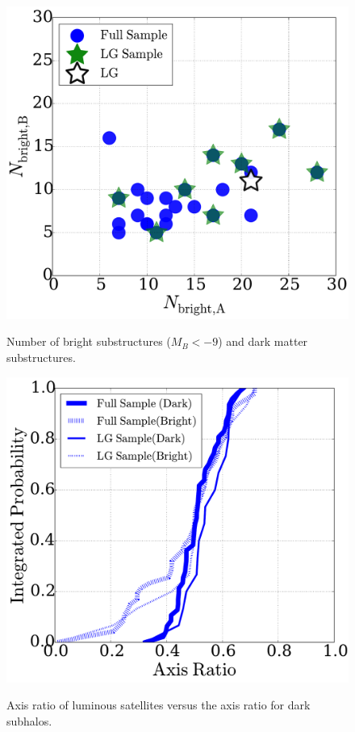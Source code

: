 \documentclass{emulateapj}
\begin{document}
\begin{figure}
\centering
\includegraphics[width=\hsize]{n_structure.pdf}\\
\caption{Number of bright substructures ($M_{B}<-9$) and dark matter
  substructures.}
\label{fig:nstructure}
\end{figure}



\begin{figure}
\centering
\includegraphics[width=\hsize]{axratio_dark_bright.pdf}\\
\caption{Axis ratio of luminous satellites versus the axis ratio for
  dark subhalos.}
\label{fig:StreamPlaneOrbit}
\end{figure}
\end{document}
